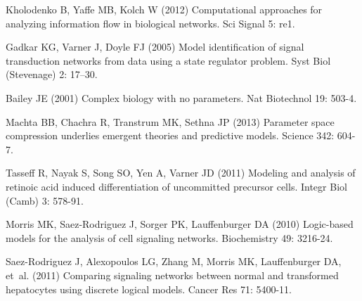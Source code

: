 \documentclass[processes,article,received,moreauthors,pdftex,12pt,a4paper]{mdpi}
\begin{document}
\begin{thebibliography}{9999}

Kholodenko B, Yaffe MB, Kolch W (2012) Computational approaches for analyzing
  information flow in biological networks.
\newblock Sci Signal 5: re1.

Gadkar KG, Varner J, Doyle FJ (2005) {Model identification of signal
  transduction networks from data using a state regulator problem.}
\newblock Syst Biol (Stevenage) 2: 17--30.

Bailey JE (2001) Complex biology with no parameters.
\newblock Nat Biotechnol 19: 503-4.

Machta BB, Chachra R, Transtrum MK, Sethna JP (2013) Parameter space
  compression underlies emergent theories and predictive models.
\newblock Science 342: 604-7.

Tasseff R, Nayak S, Song SO, Yen A, Varner JD (2011) Modeling and analysis of
  retinoic acid induced differentiation of uncommitted precursor cells.
\newblock Integr Biol (Camb) 3: 578-91.

Morris MK, Saez-Rodriguez J, Sorger PK, Lauffenburger DA (2010) Logic-based
  models for the analysis of cell signaling networks.
\newblock Biochemistry 49: 3216-24.

Saez-Rodriguez J, Alexopoulos LG, Zhang M, Morris MK, Lauffenburger DA, et~al.
  (2011) Comparing signaling networks between normal and transformed
  hepatocytes using discrete logical models.
\newblock Cancer Res 71: 5400-11.


\end{thebibliography}
\end{document}
